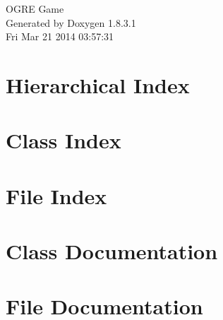 \documentclass{book}
\begin{document}
\hypersetup{pageanchor=false,citecolor=blue}
\begin{titlepage}
\vspace*{7cm}
\begin{center}
{\Large O\-G\-R\-E Game }\\
\vspace*{1cm}
{\large Generated by Doxygen 1.8.3.1}\\
\vspace*{0.5cm}
{\small Fri Mar 21 2014 03:57:31}\\
\end{center}
\end{titlepage}
\clearemptydoublepage
{}
\tableofcontents
\clearemptydoublepage
{}
\hypersetup{pageanchor=true,citecolor=blue}
\chapter{Hierarchical Index}

\chapter{Class Index}

\chapter{File Index}

\chapter{Class Documentation}













\chapter{File Documentation}






















\printindex
\end{document}
